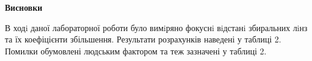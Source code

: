 \begin{center}
    \Large{\textbf{Висновки}}    
\end{center}

\vspace{1mm}

В ходi даної лабораторної роботи було вимiряно фокуснi 
вiдстанi збиральних лiнз та їх коефіцієнти збільшення.
Результати розрахунків наведені у таблиці 2.
Помилки обумовлені людським фактором та теж зазначені у таблиці 2.